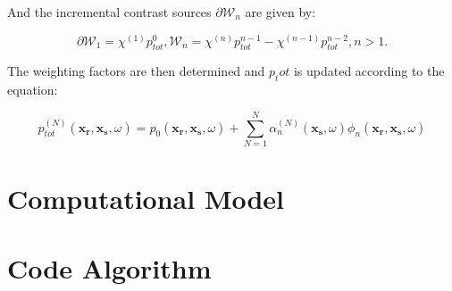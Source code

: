 \documentclass[10pt,a4paper]{article}
\begin{document}
And the incremental contrast sources $\partial \mathcal{W}_n$ are given by:

\[ \partial \mathcal{W}_1 = \chi^{(1)} p^{0}_{tot} , \mathcal{W}_n = \chi^{(n)} p^{n-1}_{tot} - \chi^{(n-1)} p^{n-2}_{tot}, n > 1. \]

The weighting factors are then determined and $p_tot$ is updated according to the equation: 

\[ p^{(N)}_{tot} (\mathbf{x_\text{r}},\mathbf{x_\text{s}},\omega) =  p_0 (\mathbf{x_\text{r}},\mathbf{x_\text{s}},\omega) + \sum\limits_{N=1}^N \alpha^{(N)}_n (\mathbf{x_\text{s}},\omega) \phi_n (\mathbf{x_\text{r}},\mathbf{x_\text{s}},\omega) \]

\section{Computational Model}

\section{Code Algorithm}
\end{document}
